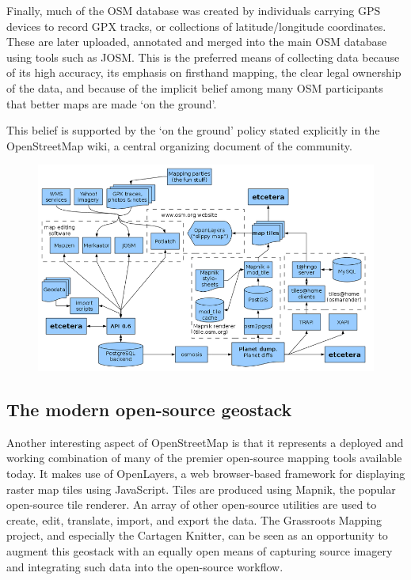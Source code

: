 \documentclass[11pt]{report}
\begin{document}
Finally, much of the OSM database was created by individuals carrying GPS devices to record GPX tracks, or collections of latitude/longitude coordinates. These are later uploaded, annotated and merged into the main OSM database using tools such as JOSM. This is the preferred means of collecting data because of its high accuracy, its emphasis on firsthand mapping, the clear legal ownership of the data, and because of the implicit belief among many OSM participants that better maps are made `on the ground'. 

This belief is supported by the `on the ground' policy stated explicitly in the OpenStreetMap wiki, a central organizing document of the community.

\begin{figure}[h]
  \begin{center}
    \includegraphics[scale=0.45]{images/osm-diagram.png}
  \end{center}
\end{figure}

\subsection{The modern open-source geostack}

Another interesting aspect of OpenStreetMap is that it represents a deployed and working combination of many of the premier open-source mapping tools available today. It makes use of OpenLayers, a web browser-based framework for displaying raster map tiles using JavaScript. Tiles are produced using Mapnik, the popular open-source tile renderer. An array of other open-source utilities are used to create, edit, translate, import, and export the data. The Grassroots Mapping project, and especially the Cartagen Knitter, can be seen as an opportunity to augment this geostack with an equally open means of capturing source imagery and integrating such data into the open-source workflow. 
\end{document}
